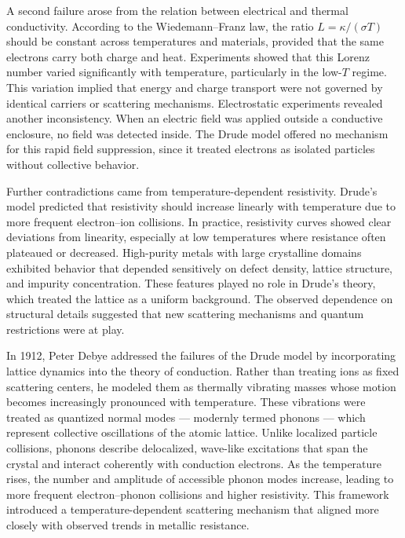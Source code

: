 A second failure arose from the relation between electrical and thermal conductivity. According to the Wiedemann–Franz law, the ratio $L = \kappa / (\sigma T)$ should be constant across temperatures and materials, provided that the same electrons carry both charge and heat. Experiments showed that this Lorenz number varied significantly with temperature, particularly in the low-$T$ regime. This variation implied that energy and charge transport were not governed by identical carriers or scattering mechanisms. Electrostatic experiments revealed another inconsistency. When an electric field was applied outside a conductive enclosure, no field was detected inside. The Drude model offered no mechanism for this rapid field suppression, since it treated electrons as isolated particles without collective behavior.

Further contradictions came from temperature-dependent resistivity. Drude's model predicted that resistivity should increase linearly with temperature due to more frequent electron–ion collisions. In practice, resistivity curves showed clear deviations from linearity, especially at low temperatures where resistance often plateaued or decreased. High-purity metals with large crystalline domains exhibited behavior that depended sensitively on defect density, lattice structure, and impurity concentration. These features played no role in Drude's theory, which treated the lattice as a uniform background. The observed dependence on structural details suggested that new scattering mechanisms and quantum restrictions were at play.

In 1912, Peter Debye addressed the failures of the Drude model by incorporating lattice dynamics into the theory of conduction. Rather than treating ions as fixed scattering centers, he modeled them as thermally vibrating masses whose motion becomes increasingly pronounced with temperature. These vibrations were treated as quantized normal modes — modernly termed phonons — which represent collective oscillations of the atomic lattice. Unlike localized particle collisions, phonons describe delocalized, wave-like excitations that span the crystal and interact coherently with conduction electrons. As the temperature rises, the number and amplitude of accessible phonon modes increase, leading to more frequent electron–phonon collisions and higher resistivity. This framework introduced a temperature-dependent scattering mechanism that aligned more closely with observed trends in metallic resistance.

